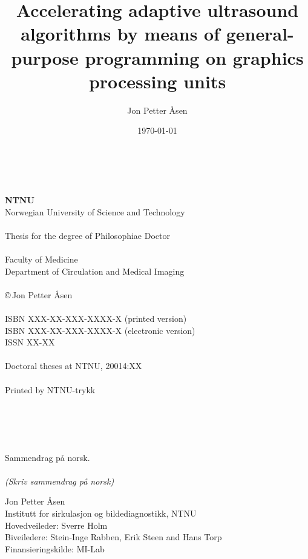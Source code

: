 \documentclass[10pt,b5paper,twoside]{book}
\author{Jon Petter \AA{}sen}
\title{%
Accelerating adaptive ultrasound algorithms by means of general-purpose programming on graphics processing units 
\vspace{0.5cm}}
\newcommand\todo[1]{{\textit{\color{red}(#1)}}}
\begin{document}
\date{\today}
\pagestyle{empty} \maketitle

\newpage%

\renewcommand{\thepage}{\roman{page}}%

~\\
\vspace{10.0cm}
~\\
{\bf NTNU}
\\
Norwegian University of Science and Technology\\
\\
Thesis for the degree of Philosophiae Doctor\\
\\
Faculty of Medicine\\
Department of Circulation and Medical Imaging\\
\\
\copyright\,Jon Petter \AA{}sen\\
\\
ISBN XXX-XX-XXX-XXXX-X (printed version)\\
ISBN XXX-XX-XXX-XXXX-X (electronic version)\\
ISSN XX-XX\\
\\
Doctoral theses at NTNU, 20014:XX\\
\\
Printed by NTNU-trykk

~\\
\newpage
~\\%
~\\%
~\\
\noindent\large 
Sammendrag p\aa{} norsk.
\\\\%
\normalsize
\todo{Skriv sammendrag p\aa{} norsk}

\vspace{0.3cm}
\noindent Jon Petter \AA{}sen\\
Institutt for sirkulasjon og bildediagnostikk, NTNU\\
Hovedveileder: Sverre Holm\\ 
Biveiledere: Stein-Inge Rabben, Erik Steen and Hans Torp\\
Finansieringskilde: MI-Lab
\end{document}
